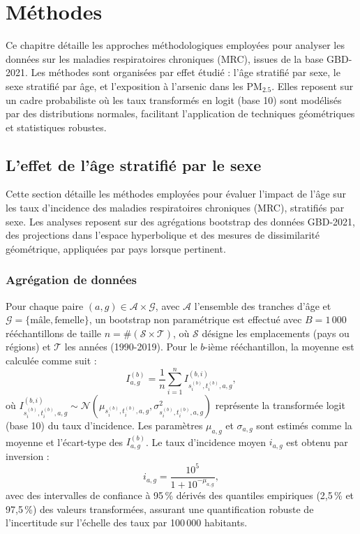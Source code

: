 \chapter{Méthodes}
\label{chap:methods}
Ce chapitre détaille les approches méthodologiques employées pour analyser les données sur les maladies respiratoires chroniques (MRC), issues de la base GBD-2021. Les méthodes sont organisées par effet étudié : l'âge stratifié par sexe, le sexe stratifié par âge, et l'exposition à l'arsenic dans les PM$_{2.5}$. Elles reposent sur un cadre probabiliste où les taux transformés en logit (base 10) sont modélisés par des distributions normales, facilitant l'application de techniques géométriques et statistiques robustes.

\section{L'effet de l'âge stratifié par le sexe}

Cette section détaille les méthodes employées pour évaluer l'impact de l'âge sur les taux d'incidence des maladies respiratoires chroniques (MRC), stratifiés par sexe. Les analyses reposent sur des agrégations bootstrap des données GBD-2021, des projections dans l'espace hyperbolique et des mesures de dissimilarité géométrique, appliquées par pays lorsque pertinent.

\subsection{Agrégation de données}

Pour chaque paire $(a, g) \in \mathcal{A} \times \mathcal{G}$, avec $\mathcal{A}$ l'ensemble des tranches d'âge et $\mathcal{G} = \{\text{mâle}, \text{femelle}\}$, un bootstrap non paramétrique est effectué avec $B = 1\,000$ rééchantillons de taille $n = \#(\mathcal{S} \times \mathcal{T})$, où $\mathcal{S}$ désigne les emplacements (pays ou régions) et $\mathcal{T}$ les années (1990-2019). Pour le $b$-ième rééchantillon, la moyenne est calculée comme suit :
\[
I_{a,g}^{(b)} = \frac{1}{n} \sum_{i=1}^n I_{s_i^{(b)}, t_i^{(b)}, a, g}^{(b,i)},
\]
où $I_{s_i^{(b)}, t_i^{(b)}, a, g}^{(b,i)} \sim \mathcal{N}(\mu_{s_i^{(b)}, t_i^{(b)}, a, g}, \sigma_{s_i^{(b)}, t_i^{(b)}, a, g}^2)$ représente la transformée logit (base 10) du taux d'incidence. Les paramètres $\mu_{a,g}$ et $\sigma_{a,g}$ sont estimés comme la moyenne et l'écart-type des $I_{a,g}^{(b)}$. Le taux d'incidence moyen $i_{a,g}$ est obtenu par inversion :
\[
i_{a,g} = \frac{10^5}{1 + 10^{-\mu_{a,g}}},
\]
avec des intervalles de confiance à 95\,\% dérivés des quantiles empiriques (2,5\,\% et 97,5\,\%) des valeurs transformées, assurant une quantification robuste de l'incertitude sur l'échelle des taux par 100\,000 habitants.

